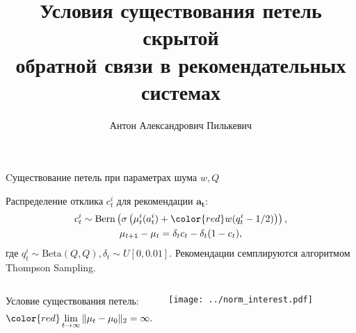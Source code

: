 \documentclass{beamer}
\title[\hbox to 56mm{Петли скрытой обратной связи}]{ Условия существования петель скрытой \\ обратной связи в рекомендательных системах }
\author[А.\,А. Пилькевич]{Антон Александрович Пилькевич}
\institute{Московский физико-технический институт}
\date{\footnotesize
\par\smallskip\emph{Курс:} Автоматизация научных исследований\par (практика, В.\,В.~Стрижов)/Группа 813
\par\smallskip\emph{Эксперт:} А.\,С.~Хританков
\par\smallskip\emph{Консультант:} А.\,С.~Хританков
\par\bigskip\small 2021}
\begin{document}
\begin{frame}
\thispagestyle{empty}
\maketitle
\end{frame}
\begin{frame}{Cуществование петель при параметрах шума $w, Q$}

Распределение отклика $c_t^i$ для рекомендации $\mathbf{a_t}$:
\begin{gather*}
  c_t^i \sim \text{Bern} \left(\sigma\left( \mu_t^i (a_t^i) + \mathbin{\color{red}w (q_t^i -1/2)} \right) \right), \\ 
\mu_{t+1} - \mu_{t} = \delta_t c_t - \delta_t (1 - c_t), 
\end{gather*}
где $q_t^i \sim \text{Beta}(Q, Q), \delta_t \sim U[0, 0.01].$
Рекомендации семплируются алгоритмом Thompson Sampling.

\begin{columns}[c]
Условие существования петель: 
\begin{gather*}
  \color{red} \lim_{t \to \infty} \|\mu_t - \mu_0 \|_2 = \infty.
\end{gather*}
\begin{center}
  \texttt{[image: ../norm\_interest.pdf]}
\end{center}
\end{columns}
\end{frame}
\end{document}
